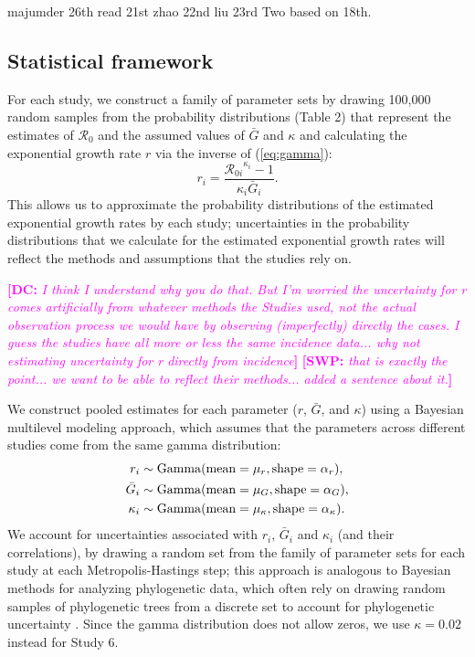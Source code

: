 \documentclass[12pt]{article}
\newcommand{\eref}[1]{(\ref{eq:#1})}
\newcommand{\Rx}[1]{\ensuremath{{\mathcal R}_{#1}}}
\newcommand{\Ro}{\Rx{0}\xspace}
\newcommand{\comment}[3]{\textcolor{#1}{\textbf{[#2: }\textsl{#3}\textbf{]}}}
\newcommand{\swp}[1]{\comment{magenta}{SWP}{#1}}
\newcommand{\dc}[1]{\comment{magenta}{DC}{#1}}
\begin{document}
majumder 26th
read 21st
zhao 22nd
liu 23rd
Two based on 18th.

\subsection{Statistical framework}

For each study, we construct a family of parameter sets by drawing 100,000 random samples from the probability distributions (Table 2) that represent the estimates of \Ro and the assumed values of $\bar G$ and $\kappa$ and calculating the exponential growth rate $r$ via the inverse of \eref{gamma}:
\begin{equation}
r_i = \frac{{\mathcal R_{0i}}^{\kappa_i} - 1}{\kappa_i \bar{G}_i}.
\end{equation}
This allows us to approximate the probability distributions of the estimated exponential growth rates by each study;
uncertainties in the probability distributions that we calculate for the estimated exponential growth rates will reflect the methods and assumptions that the studies rely on.

\dc{I think I understand why you do that. But I’m worried the uncertainty for r comes
artificially from whatever methods the Studies used, not the actual observation process we
would have by observing (imperfectly) directly the cases. I guess the studies have all more or
less the same incidence data... why not estimating uncertainty for r directly from incidence}
\swp{that is exactly the point... we want to be able to reflect their methods... added a sentence about it.}


We construct pooled estimates for each parameter ($r$, $\bar G$, and $\kappa$) using a Bayesian multilevel modeling approach, which assumes that the parameters across different studies come from the same gamma distribution:
\begin{equation}
\begin{aligned}
r_i &\sim \mathrm{Gamma}(\mathrm{mean}=\mu_r, \mathrm{shape}=\alpha_r),\\
\bar{G}_i &\sim \mathrm{Gamma}(\mathrm{mean}=\mu_G, \mathrm{shape}=\alpha_G),\\
\kappa_i &\sim \mathrm{Gamma}(\mathrm{mean}=\mu_\kappa, \mathrm{shape}=\alpha_\kappa).\\
\end{aligned}
\end{equation}
We account for uncertainties associated with $r_i$, $\bar G_i$ and $\kappa_i$ (and their correlations), by drawing a random set from the family of parameter sets for each study at each Metropolis-Hastings step;
this approach is analogous to Bayesian methods for analyzing phylogenetic data, which often rely on drawing random samples of phylogenetic trees from a discrete set to account for phylogenetic uncertainty \citep{pagel2004bayesian,bedford2014integrating}.
Since the gamma distribution does not allow zeros, we use $\kappa =0.02$ instead for Study 6.
\end{document}
